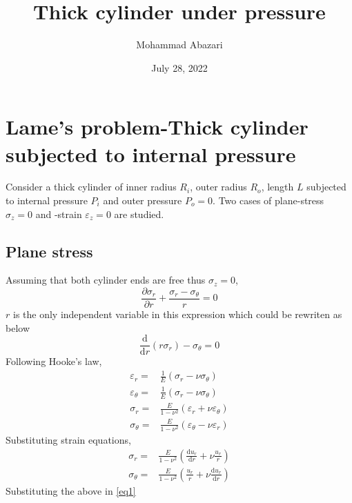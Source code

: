 \documentclass[11pt]{article} %
\title{Thick cylinder under pressure}
\author{Mohammad Abazari}
\date{July 28, 2022}
\begin{document}
\maketitle
\tableofcontents
\section{Lame's problem-Thick cylinder subjected to internal pressure}\label{sec_theory}
Consider a thick cylinder of inner radius $R_i$, outer radius $R_o$, length $L$ subjected to internal pressure $P_i$ and outer pressure $P_o=0$. Two cases of plane-stress $\sigma_z=0$ and -strain $\varepsilon_z=0$ are studied.
\subsection{Plane stress}
Assuming that both cylinder ends are free thus $\sigma_z=0$,
\begin{equation}\nonumber
\frac{\partial\sigma_r}{\partial r}+\frac{\sigma_r-\sigma_\theta}{r}=0
\end{equation}
$r$ is the only independent variable in this expression which could be rewriten as below
\begin{equation}\label{eq1}
\frac{\mathrm{d}}{\mathrm{d}r}(r\sigma_r)-\sigma_\theta=0
\end{equation}
Following Hooke's law\cite{hooke1678},
\begin{equation}\nonumber\begin{aligned}
\varepsilon_r =& \frac{1}{E}\left(\sigma_r-\nu\sigma_\theta\right)\\
\varepsilon_\theta =& \frac{1}{E}\left(\sigma_r-\nu\sigma_\theta\right)\\
\sigma_r =& \frac{E}{1-\nu^2}\left(\varepsilon_r+\nu\varepsilon_\theta\right)\\
\sigma_\theta =& \frac{E}{1-\nu^2}\left(\varepsilon_\theta-\nu\varepsilon_r\right)
\end{aligned}
\end{equation}
Substituting strain equations,
\begin{equation}\label{eq2}\begin{aligned}
\sigma_r =& \frac{E}{1-\nu^2}\left(\frac{\mathrm{d}u_r}{\mathrm{d}r}+\nu\frac{u_r}{r}\right)\\
\sigma_\theta =& \frac{E}{1-\nu^2}\left(\frac{u_r}{r}+\nu\frac{\mathrm{d}u_r}{\mathrm{d}r}\right)
\end{aligned}
\end{equation}
Substituting the above in \cref{eq1}
\end{document}
